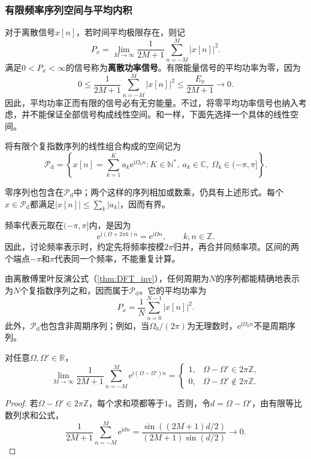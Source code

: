 \subsubsection{有限频率序列空间与平均内积}

对于离散信号$x[n]$，若时间平均极限存在，则记
$$
    P_x=\lim_{M\to\infty}\frac1{2M+1}\sum_{n=-M}^{M}|x[n]|^2.
$$
满足$0<P_x<\infty$的信号称为\textbf{离散功率信号}。有限能量信号的平均功率为零，因为
$$
    0\le\frac1{2M+1}\sum_{n=-M}^{M}|x[n]|^2
    \le\frac{E_x}{2M+1}\longrightarrow0.
$$
因此，平均功率正而有限的信号必有无穷能量。不过，将零平均功率信号也纳入考虑，并不能保证全部信号构成线性空间。和一样，下面先选择一个具体的线性空间。

\begin{definition}[有限频率序列空间]
    将有限个复指数序列的线性组合构成的空间记为
    $$
        \mathcal{P}_{\mathrm d}
        =\left\{x[n]=\sum_{k=1}^{K}a_k\mathrm{e}^{\mathrm{i}\Omega_k n}:
        K\in\mathbb{N}^*,\ a_k\in\mathbb{C},\
        \Omega_k\in(-\pi,\pi]\right\}.
    $$
\end{definition}

零序列也包含在$\mathcal{P}_{\mathrm d}$中；两个这样的序列相加或数乘，仍具有上述形式。每个$x\in\mathcal{P}_{\mathrm d}$都满足$|x[n]|\le\sum_k|a_k|$，因而有界。

频率代表元取在$(-\pi,\pi]$内，是因为
$$
    \mathrm{e}^{\mathrm{i}(\Omega+2\pi k)n}
    =\mathrm{e}^{\mathrm{i}\Omega n},\qquad k,n\in\mathbb{Z}.
$$
因此，讨论频率表示时，约定先将频率按模$2\pi$归并，再合并同频率项。区间的两个端点$-\pi$和$\pi$代表同一个频率，不能重复计算。

由离散傅里叶反演公式（\cref{thm:DFT_inv}），任何周期为$N$的序列都能精确地表示为$N$个复指数序列之和，因而属于$\mathcal{P}_{\mathrm d}$。它的平均功率为
$$
    P_x=\frac1N\sum_{n=0}^{N-1}|x[n]|^2.
$$
此外，$\mathcal{P}_{\mathrm d}$也包含非周期序列；例如，当$\Omega_0/(2\pi)$为无理数时，$\mathrm{e}^{\mathrm{i}\Omega_0 n}$不是周期序列。

\begin{proposition}[离散复指数的平均正交性]
    对任意$\Omega,\Omega'\in\mathbb{R}$，
    $$
        \lim_{M\to\infty}\frac1{2M+1}
        \sum_{n=-M}^{M}\mathrm{e}^{\mathrm{i}(\Omega-\Omega')n}
        =
        \begin{cases}
            1, & \Omega-\Omega'\in2\pi\mathbb{Z},    \\
            0, & \Omega-\Omega'\notin2\pi\mathbb{Z}.
        \end{cases}
    $$
\end{proposition}
\begin{proof}
    若$\Omega-\Omega'\in2\pi\mathbb{Z}$，每个求和项都等于$1$。否则，令$d=\Omega-\Omega'$，由有限等比数列求和公式，
    $$
        \frac1{2M+1}\sum_{n=-M}^{M}\mathrm{e}^{\mathrm{i}dn}
        =\frac{\sin((2M+1)d/2)}{(2M+1)\sin(d/2)}
        \longrightarrow0.
    $$
\end{proof}

